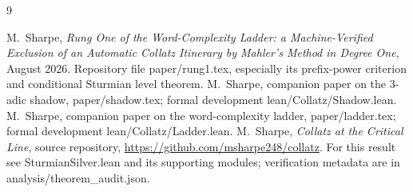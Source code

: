\documentclass[11pt]{article}
\theoremstyle{remark}
\newcommand{\code}[1]{{\small\ttfamily #1}}
\begin{document}
\begin{thebibliography}{9}
\raggedright
{} M.~Sharpe, \emph{Rung One of the Word-Complexity Ladder:
a Machine-Verified Exclusion of an Automatic Collatz Itinerary by
Mahler's Method in Degree One}, August 2026.
Repository file \code{paper/rung1.tex}, especially its prefix-power
criterion and conditional Sturmian level theorem.
 M.~Sharpe, companion paper on the 3-adic shadow,
\code{paper/shadow.tex}; formal development \code{lean/Collatz/Shadow.lean}.
 M.~Sharpe, companion paper on the word-complexity ladder,
\code{paper/ladder.tex}; formal development \code{lean/Collatz/Ladder.lean}.
 M.~Sharpe, \emph{Collatz at the Critical Line}, source
repository, \url{https://github.com/msharpe248/collatz}.
For this result see \code{SturmianSilver.lean} and its supporting modules;
verification metadata are in \code{analysis/theorem\_\allowbreak{}audit.json}.
\end{thebibliography}
\end{document}
